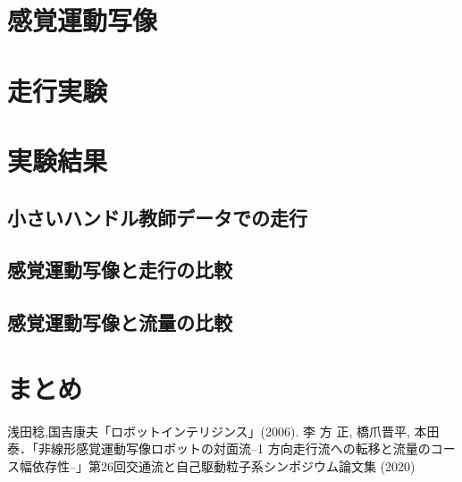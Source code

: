\documentclass[10pt,a4paper,twocolumn]{jarticle}
\begin{document}
\section{感覚運動写像}

\section{走行実験}

\section{実験結果}
\subsection{小さいハンドル教師データでの走行}

\subsection{感覚運動写像と走行の比較}

\subsection{感覚運動写像と流量の比較}

\section{まとめ}

\begin{thebibliography}{9}
 浅田稔,国吉康夫「ロボットインテリジンス」(2006).
 李 方 正, 橋爪晋平, 本田泰．「非線形感覚運動写像ロボットの対面流–1 方向走行流への転移と流量のコース幅依存性–」第26回交通流と自己駆動粒子系シンポジウム論文集 (2020)
\end{thebibliography}
\end{document}
